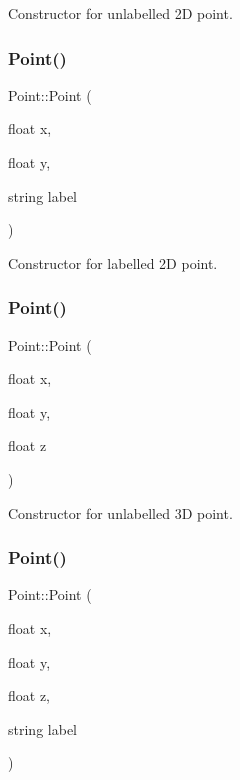 Constructor for unlabelled 2D point. 

\mbox{\label{class_point_aede82dc8eff80efec382853ecd2d31b0}} 
\subsubsection{\texorpdfstring{Point()}{Point()}\hspace{0.1cm}{\footnotesize\ttfamily [2/4]}}
{\footnotesize\ttfamily Point\+::\+Point (\begin{DoxyParamCaption}\item[{float}]{x,  }\item[{float}]{y,  }\item[{string}]{label }\end{DoxyParamCaption})}



Constructor for labelled 2D point. 

\mbox{\label{class_point_a405838cb39b8fb6119633d9ba7e6b4fb}} 
\subsubsection{\texorpdfstring{Point()}{Point()}\hspace{0.1cm}{\footnotesize\ttfamily [3/4]}}
{\footnotesize\ttfamily Point\+::\+Point (\begin{DoxyParamCaption}\item[{float}]{x,  }\item[{float}]{y,  }\item[{float}]{z }\end{DoxyParamCaption})}



Constructor for unlabelled 3D point. 

\mbox{\label{class_point_a1336b3425f9c080d170f036c336eaa64}} 
\subsubsection{\texorpdfstring{Point()}{Point()}\hspace{0.1cm}{\footnotesize\ttfamily [4/4]}}
{\footnotesize\ttfamily Point\+::\+Point (\begin{DoxyParamCaption}\item[{float}]{x,  }\item[{float}]{y,  }\item[{float}]{z,  }\item[{string}]{label }\end{DoxyParamCaption})}



